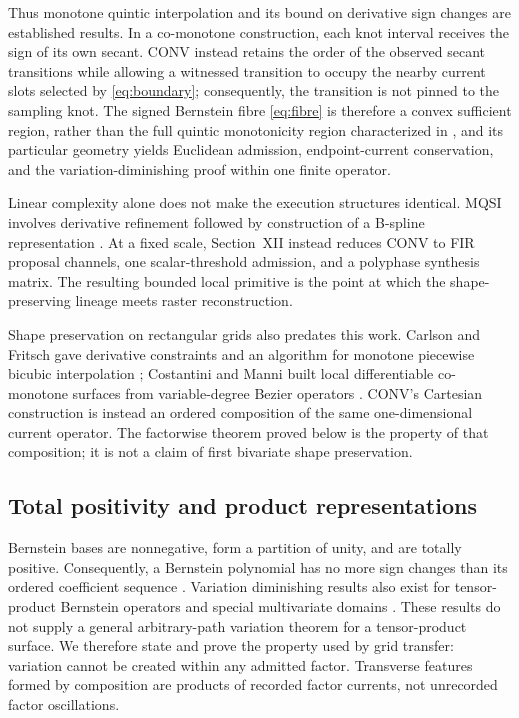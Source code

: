\documentclass[journal]{IEEEtran}
\begin{document}
Thus monotone quintic interpolation and its bound on derivative sign changes
are established results. In a co-monotone construction, each knot interval
receives the sign of its own secant. CONV instead retains the order of the
observed secant transitions while allowing a witnessed transition to occupy
the nearby current slots selected by \eqref{eq:boundary}; consequently, the
transition is not pinned to the sampling knot. The signed Bernstein fibre
\eqref{eq:fibre} is therefore a convex sufficient region, rather than the full
quintic monotonicity region characterized in \cite{ulrich1994}, and its
particular geometry yields Euclidean admission, endpoint-current
conservation, and the variation-diminishing proof within one finite operator.

Linear complexity alone does not make the execution structures identical.
MQSI involves derivative refinement followed by construction of a B-spline
representation \cite{lux2023}. At a fixed scale, Section~XII instead reduces
CONV to FIR proposal channels, one scalar-threshold admission, and a
polyphase synthesis matrix. The resulting bounded local primitive is the
point at which the shape-preserving lineage meets raster reconstruction.

Shape preservation on rectangular grids also predates this work. Carlson and
Fritsch gave derivative constraints and an algorithm for monotone piecewise
bicubic interpolation \cite{carlsonfritsch1989}; Costantini and Manni built
local differentiable co-monotone surfaces from variable-degree Bezier
operators \cite{costantinimanni1991}. CONV's Cartesian construction is instead
an ordered composition of the same one-dimensional current operator. The
factorwise theorem proved below is the property of that composition; it is not
a claim of first bivariate shape preservation.

\subsection{Total positivity and product representations}

Bernstein bases are nonnegative, form a partition of unity, and are totally
positive. Consequently, a Bernstein polynomial has no more sign changes than
its ordered coefficient sequence \cite{karlin1968,pinkus2010}. Variation
diminishing results also exist for tensor-product Bernstein operators and
special multivariate domains \cite{cavaretta1987,goodman1987}. These results
do not supply a general arbitrary-path variation theorem for a tensor-product
surface. We therefore state and prove the property used by grid transfer:
variation cannot be created within any admitted factor. Transverse features
formed by composition are products of recorded factor currents, not
unrecorded factor oscillations.
\end{document}
